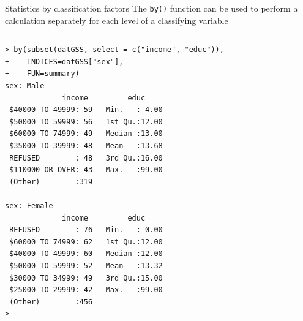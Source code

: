 \documentclass[table,smaller]{beamer}
\begin{document}
\begin{frame}[fragile,label=sec-7-3]{Statistics by classification factors}
 The \verb~by()~ function can be used to perform a calculation separately for each level of a classifying variable
\vspace{-.5em}
\begin{columns}
\begin{block}{}
\begin{verbatim}
> by(subset(datGSS, select = c("income", "educ")),
+    INDICES=datGSS["sex"],
+    FUN=summary)
sex: Male
             income         educ      
 $40000 TO 49999: 59   Min.   : 4.00  
 $50000 TO 59999: 56   1st Qu.:12.00  
 $60000 TO 74999: 49   Median :13.00  
 $35000 TO 39999: 48   Mean   :13.68  
 REFUSED        : 48   3rd Qu.:16.00  
 $110000 OR OVER: 43   Max.   :99.00  
 (Other)        :319                  
---------------------------------------------------- 
sex: Female
             income         educ      
 REFUSED        : 76   Min.   : 0.00  
 $60000 TO 74999: 62   1st Qu.:12.00  
 $40000 TO 49999: 60   Median :12.00  
 $50000 TO 59999: 52   Mean   :13.32  
 $30000 TO 34999: 49   3rd Qu.:15.00  
 $25000 TO 29999: 42   Max.   :99.00  
 (Other)        :456                  
>
\end{verbatim}
\end{block}
\end{columns}
\vspace{.5em}
\end{frame}
\end{document}
